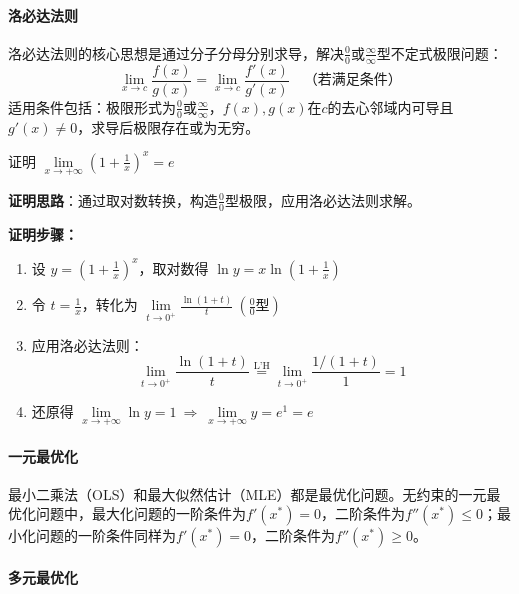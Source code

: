 \paragraph*{洛必达法则}
洛必达法则的核心思想是通过分子分母分别求导，解决$\frac{0}{0}$或$\frac{\infty}{\infty}$型不定式极限问题：
\begin{equation}
	\lim_{x \to c} \frac{f(x)}{g(x)} = \lim_{x \to c} \frac{f'(x)}{g'(x)} \quad \text{（若满足条件）}
\end{equation}
适用条件包括：极限形式为$\frac{0}{0}$或$\frac{\infty}{\infty}$，$f(x), g(x)$在$c$的去心邻域内可导且$g'(x) \neq 0$，求导后极限存在或为无穷。

\vspace{0.8em} %

\begin{example}
\noindent 证明 $\lim\limits_{x\to+\infty}\left(1+\frac{1}{x}\right)^{x}=e$
	\begin{flushleft}
		\textbf{证明思路}：通过取对数转换，构造$\frac{0}{0}$型极限，应用洛必达法则求解。
	\end{flushleft}
	\begin{flushleft}	
		\textbf{证明步骤：}
	\end{flushleft}
	\begin{enumerate}
		\item 设 $y = \left(1+\frac{1}{x}\right)^x$，取对数得 $\ln y = x\ln\left(1+\frac{1}{x}\right)$
		\item 令 $t=\frac{1}{x}$，转化为 $\lim\limits_{t\to 0^+}\frac{\ln(1+t)}{t}\ \left(\frac{0}{0}\text{型}\right)$
		\item 应用洛必达法则：
		$$
		\lim_{t\to 0^+}\frac{\ln(1+t)}{t} \overset{\text{L'H}}{=} \lim_{t\to 0^+}\frac{1/(1+t)}{1} = 1
		$$
		\item 还原得 $\lim\limits_{x\to+\infty}\ln y =1 \ \Rightarrow\ \lim\limits_{x\to+\infty} y = e^1 = e$
	\end{enumerate}
\end{example}

\paragraph*{一元最优化}
最小二乘法（OLS）和最大似然估计（MLE）都是最优化问题。无约束的一元最优化问题中，最大化问题的一阶条件为$f'(x^*) = 0$，二阶条件为$f''(x^*) \leq 0$；最小化问题的一阶条件同样为$f'(x^*) = 0$，二阶条件为$f''(x^*) \geq 0$。

\paragraph*{多元最优化}

